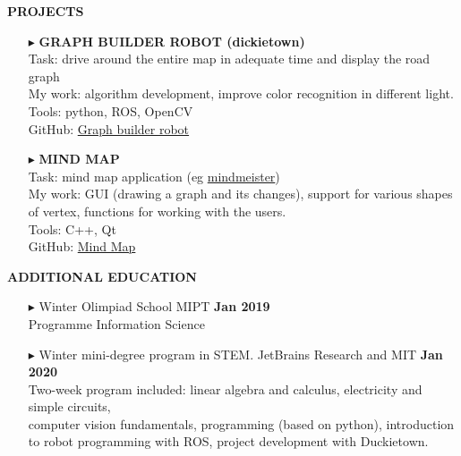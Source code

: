\documentclass[a4paper,10pt]{article}
\begin{document}
	\colorbox{magicmint}{
		\begin{minipage}{0.96\textwidth}
			\vphantom{.}
			\textbf{PROJECTS}
		\end{minipage}
	}
	\begin{itemize}
	
		\item[$\blacktriangleright$] \textbf{GRAPH BUILDER ROBOT (dickietown)}\\
		Task: drive around the entire map in adequate time and display the road graph\\
		My  work: algorithm development, improve color recognition in different light. \\
		Tools: python, ROS, OpenCV\\
		GitHub: \href{https://github.com/Kira5005-code/template-ros-core} {Graph builder robot}
		\item[$\blacktriangleright$] \textbf{MIND MAP}\\
		Task: mind map application (eg \href{https://www.mindmeister.com} {mindmeister})\\
		My work: GUI (drawing a graph and its changes), support for various shapes of vertex, functions for working with the users. \\
		Tools: C++, Qt\\
		GitHub: \href{https://github.com/Kira5005-code/Mind-Map} {Mind Map}
		
	\end{itemize}

	\colorbox{magicmint}{
		\begin{minipage}{0.96\textwidth}
			\vphantom{.}
			\textbf{ADDITIONAL EDUCATION}
		\end{minipage}
	}
	
	\begin{itemize}
		\item[$\blacktriangleright$]  Winter Olimpiad School MIPT \hspace{10.4cm}\textbf{Jan 2019} \\ Programme Information Science 
		\item[$\blacktriangleright$]  Winter mini-degree program in STEM. JetBrains Research and MIT \hspace{4.7cm}\textbf{Jan 2020} \\ 
		Two-week program included: linear algebra and calculus, electricity and simple circuits,\\ computer vision fundamentals, programming (based on python), introduction to robot programming with ROS, project development with Duckietown.
	\end{itemize}
	
\end{document}
